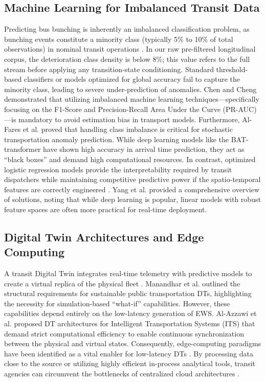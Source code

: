 \documentclass[journal,twocolumn]{IEEEtran}
\begin{document}
\subsection{Machine Learning for Imbalanced Transit Data}
Predicting bus bunching is inherently an imbalanced classification problem, as bunching events constitute a minority class (typically 5\% to 10\% of total observations) in nominal transit operations \cite{16}. In our raw pre-filtered longitudinal corpus, the deterioration class density is below 8\%; this value refers to the full stream before applying any transition-state conditioning. Standard threshold-based classifiers or models optimized for global accuracy fail to capture the minority class, leading to severe under-prediction of anomalies. Chen and Cheng \cite{17} demonstrated that utilizing imbalanced machine learning techniques---specifically focusing on the F1-Score and Precision-Recall Area Under the Curve (PR-AUC)---is mandatory to avoid estimation bias in transport models. Furthermore, Al-Fares et al. \cite{18} proved that handling class imbalance is critical for stochastic transportation anomaly prediction. While deep learning models like the BAT-transformer \cite{19} have shown high accuracy in arrival time prediction, they act as ``black boxes'' and demand high computational resources. In contrast, optimized logistic regression models provide the interpretability required by transit dispatchers while maintaining competitive predictive power if the spatio-temporal features are correctly engineered \cite{20}. Yang et al. \cite{21} provided a comprehensive overview of solutions, noting that while deep learning is popular, linear models with robust feature spaces are often more practical for real-time deployment.

\subsection{Digital Twin Architectures and Edge Computing}
A transit Digital Twin integrates real-time telemetry with predictive models to create a virtual replica of the physical fleet \cite{22,23}. Manandhar et al. \cite{24} outlined the structural requirements for sustainable public transportation DTs, highlighting the necessity for simulation-based ``what-if'' capabilities. However, these capabilities depend entirely on the low-latency generation of EWS. Al-Azzawi et al. \cite{25} proposed DT architectures for Intelligent Transportation Systems (ITS) that demand strict computational efficiency to enable continuous synchronization between the physical and virtual states. Consequently, edge-computing paradigms have been identified as a vital enabler for low-latency DTs \cite{26}. By processing data close to the source or utilizing highly efficient in-process analytical tools, transit agencies can circumvent the bottlenecks of centralized cloud architectures \cite{27}.
\end{document}
